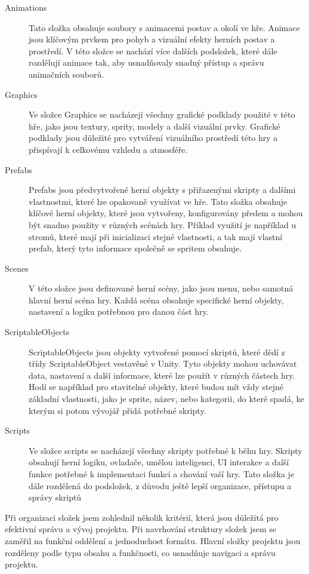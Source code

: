 \begin{description}
	\item[Animations] Tato složka obsahuje soubory s animacemi postav a okolí ve hře. Animace jsou klíčovým prvkem pro pohyb a vizuální efekty herních postav a prostředí. V této složce se nachází více dalších podsložek, které dále rozdělují animace tak, aby usnadňovaly snadný přístup a správu animačních souborů.
	\item[Graphics] Ve složce Graphics se nacházejí všechny grafické podklady použité v této hře, jako jsou textury, sprity, modely a další vizuální prvky. Grafické podklady jsou důležité pro vytváření vizuálního prostředí této hry a přispívají k celkovému vzhledu a atmosféře.
	\item[Prefabs] Prefabs jsou předvytvořené herní objekty s přiřazenými skripty a dalšími vlastnostmi, které lze opakovaně využívat ve hře.
	Tato složka obsahuje klíčové herní objekty, které jsou vytvořeny, konfigurovány předem a mohou být snadno použity v různých scénách hry. Příklad využití je například u stromů, které mají při inicializaci stejné vlastnosti, a tak mají vlastní prefab, který tyto informace společně se spritem obsahuje.
	\item[Scenes] V této složce jsou definované herní scény, jako jsou menu, nebo samotná hlavní herní scéna hry. Každá scéna obsahuje specifické herní objekty, nastavení a logiku potřebnou pro danou část hry.
	\item[ScriptableObjects] ScriptableObjects jsou objekty vytvořené pomocí skriptů, které dědí z třídy ScriptableObject vestavěné v Unity. Tyto objekty mohou uchovávat data, nastavení a další informace, které lze použít v různých částech hry. Hodí se například pro stavitelné objekty, které budou mít vždy stejné základní vlastnosti, jako je sprite, název, nebo kategorii, do které spadá, ke kterým si potom vývojář přidá potřebné skripty.
	\item[Scripts] Ve složce scripts se nacházejí všechny skripty potřebné k běhu hry. Skripty obsahují herní logiku, ovladače, umělou inteligenci, UI interakce a další funkce potřebné k implementaci funkcí a chování vaší hry. Tato složka je dále rozdělená do podsložek, z důvodu ještě lepší organizace, přístupu a správy skriptů
\end{description}

Při organizaci složek jsem zohlednil několik kritérií, která jsou důležitá pro efektivní správu a vývoj projektu. Při navrhování struktury složek jsem se zaměřil na funkční oddělení a jednoduchost formátu. Hlavní složky projektu jsou rozděleny podle typu obsahu a funkčnosti, co usnadňuje navigaci a správu projektu.

